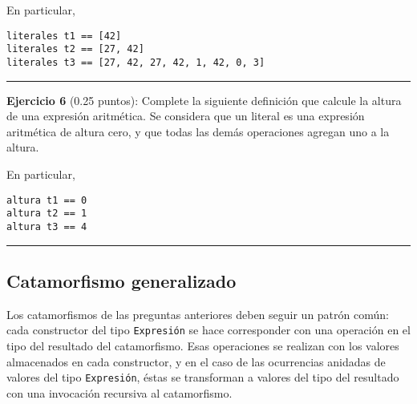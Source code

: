 En particular,

\begin{verbatim}
literales t1 == [42]
literales t2 == [27, 42]
literales t3 == [27, 42, 27, 42, 1, 42, 0, 3]
\end{verbatim}

\begin{center}\rule{3in}{0.4pt}\end{center}

\textbf{Ejercicio 6} (0.25 puntos): Complete la siguiente definición que
calcule la altura de una expresión aritmética. Se considera que un
literal es una expresión aritmética de altura cero, y que todas las
demás operaciones agregan uno a la altura.

\begin{Shaded}
\begin{Highlighting}[]
\OtherTok{->} 
  \FunctionTok{=}  
              \OtherTok{->} 
             \OtherTok{->}  \FunctionTok{+} 
                 \OtherTok{->}  \FunctionTok{+} 
                \OtherTok{->}  \FunctionTok{+} 
      \OtherTok{->}  \FunctionTok{+} 
      \OtherTok{->}  \FunctionTok{+} 
\end{Highlighting}
\end{Shaded}

En particular,

\begin{verbatim}
altura t1 == 0
altura t2 == 1
altura t3 == 4
\end{verbatim}

\begin{center}\rule{3in}{0.4pt}\end{center}

\subsection{Catamorfismo generalizado}\label{catamorfismo-generalizado}

Los catamorfismos de las preguntas anteriores deben seguir un patrón
común: cada constructor del tipo \texttt{Expresión} se hace corresponder
con una operación en el tipo del resultado del catamorfismo. Esas
operaciones se realizan con los valores almacenados en cada constructor,
y en el caso de las ocurrencias anidadas de valores del tipo
\texttt{Expresión}, éstas se transforman a valores del tipo del
resultado con una invocación recursiva al catamorfismo.

